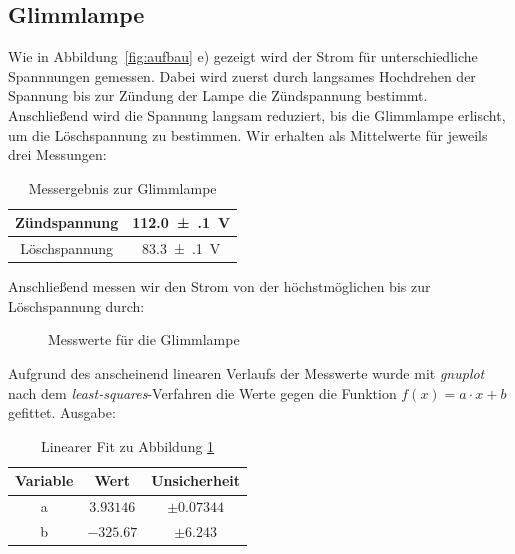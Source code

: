\subsection{Glimmlampe}
Wie in Abbildung~\ref{fig:aufbau} e) gezeigt wird der Strom für unterschiedliche Spannnungen gemessen. Dabei wird zuerst durch langsames Hochdrehen der Spannung bis zur Zündung der Lampe die Zündspannung bestimmt. Anschließend wird die Spannung langsam reduziert, bis die Glimmlampe erlischt, um die Löschspannung zu bestimmen. Wir erhalten als Mittelwerte für jeweils drei Messungen:
\begin{table}[H]
  \centering
  \begin{tabular}{c | c}
    Zündspannung & \SI{112.0(1)}{V} \\ \hline
    Löschspannung & \SI{83.3(1)}{V} \\
  \end{tabular}
  \caption{Messergebnis zur Glimmlampe}
  \label{tab:glimm}
\end{table}

Anschließend messen wir den Strom von der höchstmöglichen bis zur Löschspannung durch:

\begin{figure}[H]
\centering
{}
\caption{Messwerte für die Glimmlampe}
\label{fig:glimm}
\end{figure}
Aufgrund des anscheinend linearen Verlaufs der Messwerte wurde mit \emph{gnuplot} nach dem \emph{least-squares}-Verfahren die Werte gegen die Funktion $f(x)=a\cdot x +b$ gefittet. Ausgabe:
\begin{table}[H]
  \centering
  \begin{tabular}{c | c | c }
    Variable   & Wert & Unsicherheit\\ \hline
    a & $\num{3.93146}$ & $\pm\num{0.07344}$ \\
    b & $\num{-325.67}$ & $\pm\num{6.243}$ \\
  \end{tabular}
  \caption{Linearer Fit zu Abbildung \ref{fig:glimm}}
  \label{tab:fitglimm}
\end{table}

